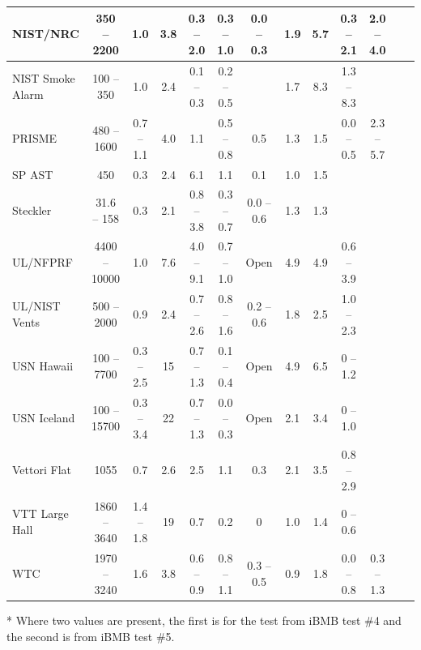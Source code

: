 \begin{table}
\begin{center}
\begin{tabular}{|l|c|c|c|c|c|c|c|c|c|c|c|c|}
NIST/NRC            & 350 -- 2200   & 1.0           & 3.8   & 0.3 -- 2.0        & 0.3 -- 1.0          & 0.0 -- 0.3    & 1.9         & 5.7         & 0.3 -- 2.1             & 2.0 -- 4.0            \\ \hline
NIST Smoke Alarm    & 100 -- 350    & 1.0           & 2.4   & 0.1 -- 0.3        & 0.2 -- 0.5          &               & 1.7         & 8.3         & 1.3 -- 8.3             &                       \\ \hline
PRISME              & 480 -- 1600   & 0.7 -- 1.1    & 4.0   & 1.1               & 0.5 -- 0.8          & 0.5           & 1.3         & 1.5         & 0.0 -- 0.5             & 2.3 -- 5.7            \\ \hline
SP AST              & 450           & 0.3           & 2.4   & 6.1               & 1.1                 & 0.1           & 1.0         & 1.5         &                        &                       \\ \hline
Steckler            & 31.6 -- 158   & 0.3           & 2.1   & 0.8 -- 3.8        & 0.3 -- 0.7          & 0.0 -- 0.6    & 1.3         & 1.3         &                        &                       \\ \hline
UL/NFPRF            & 4400 -- 10000 & 1.0           & 7.6   & 4.0 -- 9.1        & 0.7 -- 1.0          & Open          & 4.9         & 4.9         & 0.6 -- 3.9             &                       \\ \hline
UL/NIST Vents       & 500 -- 2000   & 0.9           & 2.4   & 0.7 -- 2.6        & 0.8 -- 1.6          & 0.2 -- 0.6    & 1.8         & 2.5         & 1.0 -- 2.3             &                       \\ \hline
USN Hawaii          & 100 -- 7700   & 0.3 -- 2.5    & 15    & 0.7 -- 1.3        & 0.1 -- 0.4          & Open          & 4.9         & 6.5         & 0 -- 1.2               &                       \\ \hline
USN Iceland         & 100 -- 15700  & 0.3 -- 3.4    & 22    & 0.7 -- 1.3        & 0.0 -- 0.3          & Open          & 2.1         & 3.4         & 0 -- 1.0               &                       \\ \hline
Vettori Flat        & 1055          & 0.7           & 2.6   & 2.5               & 1.1                 & 0.3           & 2.1         & 3.5         & 0.8 -- 2.9             &                       \\ \hline
VTT Large Hall      & 1860 -- 3640  & 1.4 -- 1.8    & 19    & 0.7               & 0.2                 & 0             & 1.0         & 1.4         & 0 -- 0.6               &                       \\ \hline
WTC                 & 1970 -- 3240  & 1.6           & 3.8   & 0.6 -- 0.9        & 0.8 -- 1.1          & 0.3 -- 0.5    & 0.9         & 1.8         & 0.0 -- 0.8             & 0.3 -- 1.3            \\ \hline
\end{tabular}
\end{center}
* Where two values are present, the first is for the test from iBMB test \#4 and the second is from iBMB test \#5.
\label{Test_Parameters}
\nopagebreak
\end{table}




\noindent
